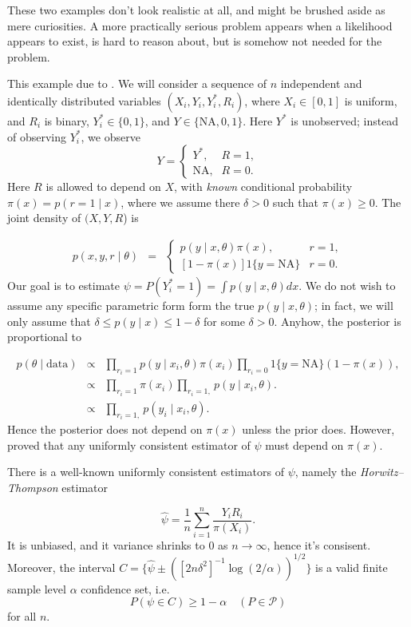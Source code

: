 These two examples don't look realistic at all, and might be brushed
aside as mere curiosities. A more practically serious problem appears
when a likelihood appears to exist, is hard to reason about, but is
somehow not needed for the problem.
\begin{example}
 This example due to \cite{Robins2012-fr}. We will consider a sequence
of $n$ independent and identically distributed variables $(X_{i},Y_{i},Y_{i}^{*},R_{i})$,
where $X_{i}\in[0,1]$ is uniform, and $R_{i}$ is binary, $Y_{i}^{*}\in\{0,1\}$,
and $Y\in\{\textrm{NA},0,1\}$. Here $Y^{*}$ is unobserved; instead
of observing $Y_{i}^{*}$, we observe 
\[
Y=\begin{cases}
Y^{*}, & R=1,\\
\textrm{NA}, & R=0.
\end{cases}
\]
Here $R$ is allowed to depend on $X$, with \emph{known} conditional
probability $\pi(x)=p(r=1\mid x)$, where we assume there $\delta>0$
such that $\pi(x)\geq0$. The joint density of $(X,Y,R$) is

\begin{eqnarray*}
p(x,y,r\mid\theta) & = & \begin{cases}
p(y\mid x,\theta)\pi(x), & r=1,\\{}
[1-\pi(x)]1\{y=\textrm{NA}\} & r=0.
\end{cases}
\end{eqnarray*}
Our goal is to estimate $\psi=P(Y_{i}^{*}=1)=\int p(y\mid x,\theta)dx$.
We do not wish to assume any specific parametric form form the true
$p(y\mid x,\theta)$; in fact, we will only assume that $\delta\leq p(y\mid x)\leq1-\delta$
for some $\delta>0$. Anyhow, the posterior is proportional to

\begin{eqnarray*}
p(\theta\mid\textrm{data}) & \propto & \prod_{r_{i}=1}p(y\mid x_{i},\theta)\pi(x_{i})\prod_{r_{i}=0}1\{y=\textrm{NA}\}(1-\pi(x)),\\
 & \propto & \prod_{r_{i}=1}\pi(x_{i})\prod_{r_{i}=1,}p(y\mid x_{i},\theta).\\
 & \propto & \prod_{r_{i}=1,}p(y_{i}\mid x_{i},\theta).
\end{eqnarray*}
Hence the posterior does not depend on $\pi(x)$ unless the prior
does. However, \cite{Robins1997-uv} proved that any uniformly consistent
estimator of $\psi$ must depend on $\pi(x)$. 

There is a well-known uniformly consistent estimators of $\psi$,
namely the \emph{Horwitz--Thompson} estimator

\begin{equation}
\hat{\psi}=\frac{1}{n}\sum_{i=1}^{n}\frac{Y_{i}R_{i}}{\pi(X_{i})}.\label{eq:Horwitz-Thompson}
\end{equation}
It is unbiased, and it variance shrinks to $0$ as $n\to\infty$,
hence it's consisent. Moreover, the interval $C=\{\hat{\psi}\pm([2n\delta^{2}]^{-1}\log(2/\alpha))^{1/2}\}$
is a valid finite sample level $\alpha$ confidence set, i.e.
\[
P(\psi\in C)\geq1-\alpha\quad(P\in\mathcal{P})
\]
for all $n$.
\end{example}

